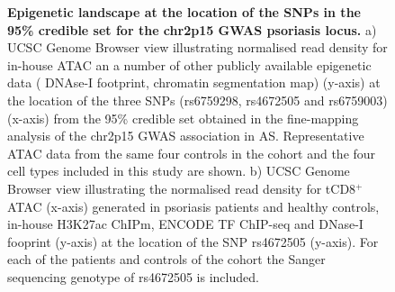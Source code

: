 \begin{figure}[htbp]
\begin{subfigure}{0.5\textwidth}
\caption{\textbf{}}
\end{subfigure}
\caption[Epigenetic landscape at the location of the SNPs in the 95\% credible set for the chr2p15 GWAS psoriasis locus.]{\textbf{Epigenetic landscape at the location of the SNPs in the 95\% credible set for the chr2p15 GWAS psoriasis locus.} a) UCSC Genome Browser view illustrating normalised read density for in-house ATAC an a number of other publicly available epigenetic data ( DNAse-I footprint, chromatin segmentation map) (y-axis) at the location of the three SNPs (rs6759298, rs4672505 and rs6759003) (x-axis) from the 95\% credible set obtained in the fine-mapping analysis of the chr2p15 GWAS association in AS. Representative ATAC data from the same four controls in the cohort and the four cell types included in this study are shown. b) UCSC Genome Browser view illustrating the normalised read density for tCD8$^+$ ATAC (x-axis) generated in psoriasis patients and healthy controls, in-house H3K27ac ChIPm, ENCODE TF ChIP-seq and DNase-I fooprint (y-axis) at the location of the SNP rs4672505 (y-axis). For each of the patients and controls of the cohort the Sanger sequencing genotype of rs4672505 is included.}
\label{figure:ATAC_PS_CTL_chr2p15_rs4672505}
\end{figure} 


